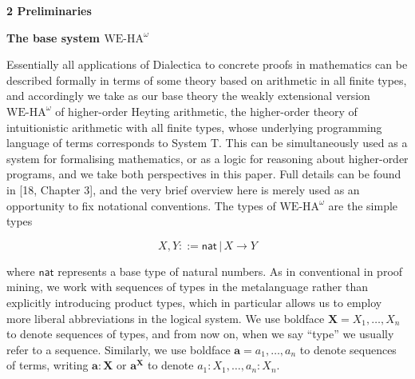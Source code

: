
 
\par\medskip\noindent\textbf{2 Preliminaries}\par
 
 
\par\medskip\noindent\textbf{The base system $\mathrm{WE}\mbox{-}\mathrm{HA}^{\omega}$}\par
 
 
Essentially all applications of Dialectica to concrete proofs in mathematics can be described formally in terms of some theory based on arithmetic in all finite types, and accordingly we take as our base theory the weakly extensional version $\mathrm{WE}\mbox{-}\mathrm{HA}^{\omega}$ of higher-order Heyting arithmetic, the higher-order theory of intuitionistic arithmetic with all finite types, whose underlying programming language of terms corresponds to System T. This can be simultaneously used as a system for formalising mathematics, or as a logic for reasoning about higher-order programs, and we take both perspectives in this paper. Full details can be found in [18, Chapter 3], and the very brief overview here is merely used as an opportunity to fix notational conventions. The types of $\mathrm{WE}\mbox{-}\mathrm{HA}^{\omega}$ are the simple types\par
  
\par  \quad  \[X,Y::=\mathsf{nat}\,|\,X\to Y\]\quad  \quad  
  
where $\mathsf{nat}$ represents a base type of natural numbers. As in conventional in proof mining, we work with sequences of types in the metalanguage rather than explicitly introducing product types, which in particular allows us to employ more liberal abbreviations in the logical system. We use boldface $\bm{X}=X_{1},\ldots,X_{n}$ to denote sequences of types, and from now on, when we say “type” we usually refer to a sequence. Similarly, we use boldface $\bm{a}=a_{1},\ldots,a_{n}$ to denote sequences of terms, writing $\bm{a}:\bm{X}$ or $\bm{a}^{\bm{X}}$ to denote $a_{1}:X_{1},\ldots,a_{n}:X_{n}$.\par
 
 
 
